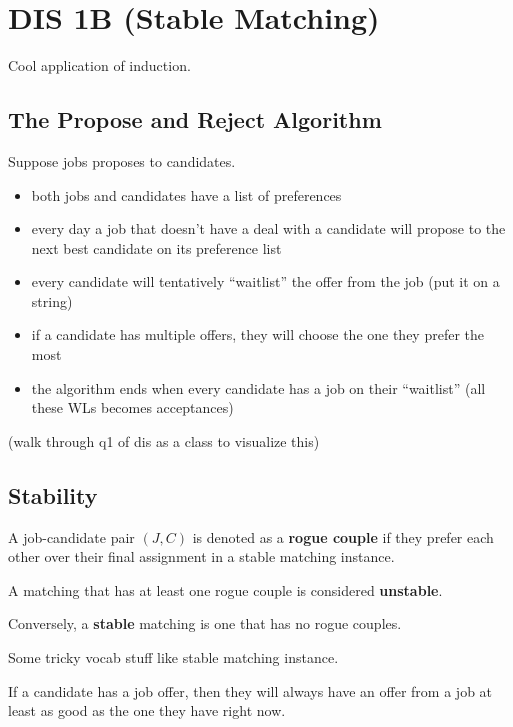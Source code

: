 \section{DIS 1B (Stable Matching)}


Cool application of induction. 

\subsection{The Propose and Reject Algorithm}

Suppose jobs proposes to candidates. 

\begin{itemize}
    \item both jobs and candidates have a list of preferences 
    \item every day a job that doesn't have a deal with a candidate will propose to the next best candidate on its preference list
    \item every candidate will tentatively ``waitlist'' the offer from the job (put it on a string)
    \item if a candidate has multiple offers, they will choose the one they prefer the most
    \item the algorithm ends when every candidate has a job on their ``waitlist'' (all these WLs becomes acceptances)
\end{itemize}

(walk through q1 of dis as a class to visualize this)

\subsection{Stability}
\begin{definition}
    A job-candidate pair $(J,C)$ is denoted as a \textbf{rogue couple} if they prefer each other over their final assignment in a stable matching instance. 
\end{definition}

\begin{definition}[Unstable]
    A matching that has at least one rogue couple is considered \textbf{unstable}.
\end{definition}

Conversely, a \textbf{stable} matching is one that has no rogue couples. 

Some tricky vocab stuff like stable matching instance. 

\begin{lemma}[Improvement]
    If a candidate has a job offer, then they will always have an offer from a job at least as good as the one they have right now. 
\end{lemma}

